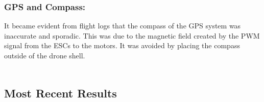 \subsubsection*{GPS and Compass:}  It became evident from flight logs that the compass of the GPS system was inaccurate and sporadic. This was due to the magnetic field created by the PWM signal from the ESCs to the motors. It was avoided by placing the compass outside of the drone shell.\\\\

\subsection{Most Recent Results}
